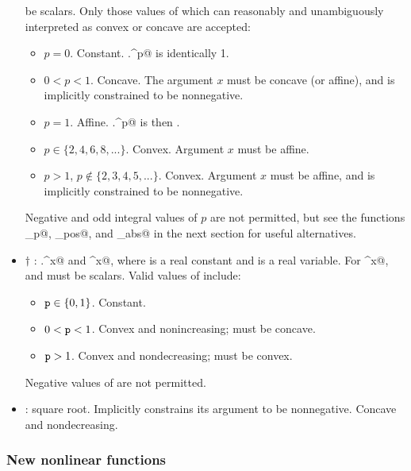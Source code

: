 \documentclass[12pt]{article}
\begin{document}
\begin{itemize}
be scalars. 
Only those values of \verb@p@ which can reasonably and unambiguously
interpreted as convex or concave are accepted:
\begin{itemize}
\item $p=0$. Constant. \verb@x.^p@ is identically 1.
\item $0<p<1$. Concave. The argument $x$ must be concave (or affine), and is
      implicitly constrained to be nonnegative.
\item $p=1$. Affine. \verb@x.^p@ is then \verb@x@.
\item $p\in\{2,4,6,8,...\}$. Convex. Argument $x$ must be affine.
\item $p>1$, $p\not\in\{2,3,4,5,...\}$. Convex. Argument $x$ must be affine,
and is implicitly constrained to be nonnegative.
\end{itemize}
Negative and odd integral values of $p$ are not permitted,
but see the functions
\verb@pow_p@, \verb@pow_pos@, and \verb@pow_abs@ in the next section
for useful alternatives.
\item $\dagger$ \verb@power@: \verb@p.^x@ and \verb@p^x@, where \verb@p@ is a real constant and 
\verb@x@ is a real variable. For \verb@p^x@, \verb@p@ and \verb@x@ must
be scalars. Valid values of \verb@p@ include:
\begin{itemize}
\item $\verb@p@\in\{0,1\}$. Constant.
\item $0<\verb@p@<1$. Convex and nonincreasing; \verb@x@ must be concave.
\item $\verb@p@>1$. Convex and nondecreasing; \verb@x@ must be convex.
\end{itemize}
Negative values of \verb@p@ are not permitted.
\item \verb@sqrt@: square root. Implicitly constrains its argument to be
nonnegative. Concave and nondecreasing.
\end{itemize}

\subsubsection{New nonlinear functions}
\end{document}
